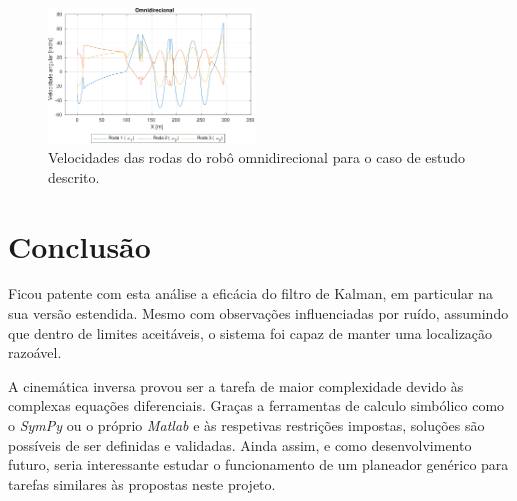 \documentclass[twocolumn]{article}
\begin{document}
\begin{figure}[ht]
    \centering
    \includegraphics[width=0.49\textwidth]{figs/omni_wheels.pdf}
    \caption{Velocidades das rodas do robô omnidirecional para o caso de estudo descrito.}
    \label{fig:omni_wheels}
\end{figure}

     

\section{Conclusão}

Ficou patente com esta análise a eficácia do filtro de Kalman, em particular na sua versão estendida. Mesmo com observações influenciadas por ruído, assumindo que dentro de limites aceitáveis, o sistema foi capaz de manter uma localização razoável.

A cinemática inversa provou ser a tarefa de maior complexidade devido às complexas equações diferenciais. Graças a ferramentas de calculo simbólico como o \textit{SymPy} ou o próprio \textit{Matlab} e às respetivas restrições impostas, soluções são possíveis de ser definidas e validadas. Ainda assim, e como desenvolvimento futuro, seria interessante estudar o funcionamento de um planeador genérico para tarefas similares às propostas neste projeto.

\printbibliography
\end{document}
